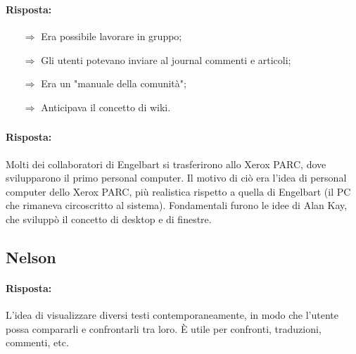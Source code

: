 \subsubsection{}


\paragraph{Risposta:}

\begin{itemize}
    \item [$\Rightarrow$] Era possibile lavorare in gruppo;
    \item [$\Rightarrow$] Gli utenti potevano inviare al journal commenti e articoli;
    \item [$\Rightarrow$] Era un "manuale della comunità";
    \item [$\Rightarrow$] Anticipava il concetto di wiki.
\end{itemize}

\subsubsection{}


\paragraph{Risposta:} Molti dei collaboratori di Engelbart si trasferirono allo Xerox PARC, dove svilupparono
il primo personal computer. Il motivo di ciò era l'idea di personal computer dello Xerox PARC, più realistica
rispetto a quella di Engelbart (il PC che rimaneva circoscritto al sistema). Fondamentali 
furono le idee di Alan Kay, che sviluppò il concetto di desktop e di finestre.

\subsection{Nelson}


\paragraph{Risposta:} L'idea di visualizzare diversi testi contemporaneamente, in modo che l'utente possa
compararli e confrontarli tra loro. È utile per confronti, traduzioni, commenti, etc.

